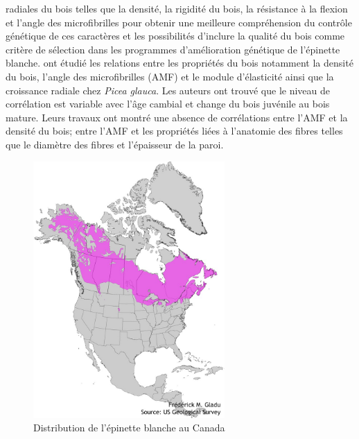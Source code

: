 \documentclass{report}
\begin{document}
radiales du bois telles que la densité, la rigidité du bois, la résistance à la flexion et l'angle des microfibrilles \citep{Lenz2010,McLean2016} pour obtenir une meilleure compréhension du contrôle génétique de ces caractères et les possibilités d'inclure la qualité du bois comme critère de sélection dans les programmes d'amélioration génétique de l'épinette blanche. \cite{Lenz2011} ont étudié les relations entre les propriétés du bois notamment la densité du bois, l'angle des microfibrilles (AMF) et le module d'élasticité ainsi que la croissance radiale chez \textit{Picea glauca}. Les auteurs ont trouvé que le niveau de corrélation est variable avec l'âge cambial et change du bois juvénile au bois mature. Leurs travaux ont montré une absence de corrélations entre l'AMF et la densité du bois; entre l'AMF et les propriétés liées à l'anatomie des fibres telles que le diamètre des fibres et l'épaisseur de la paroi. \\ 

\begin{figure}
	
	\centering
	\includegraphics[width=0.65\textwidth]{distribution.jpg}
	\caption{Distribution de l'épinette blanche au Canada}
	\label{fig:distribution}
	
	
\end{figure}
\end{document}
